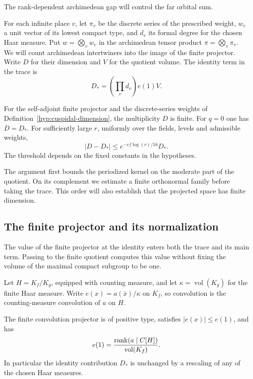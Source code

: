 The rank-dependent archimedean gap will control the far orbital sum.

For each infinite place \(v\), let \(\pi_v\) be the
discrete series of the prescribed weight, \(w_v\) a unit vector
of its lowest compact type, and \(d_v\) its formal degree for
the chosen Haar measure. Put \(w=\bigotimes_v w_v\) in the
archimedean tensor product \(\pi=\bigotimes_v\pi_v\). We will
count archimedean intertwiners into the image of the finite
projector. Write \(D\) for their dimension and \(V\) for the
quotient volume. The identity term in the trace is
\[
        D_*=\left(\prod_v d_v\right)e(1)V.
\]

\begin{proposition}\label{prop:projector-dimension}
For the self-adjoint finite projector and the discrete-series weights
of Definition~\ref{hyp:cuspidal-dimension}, the multiplicity \(D\) is finite. For \(q=0\) one has \(D=D_*\). For sufficiently large \(r\),
uniformly over the fields, levels and admissible weights,
\begin{equation}\label{eq:dimension-count}
    |D-D_*|\le e^{-rf\log(r)/16}D_* .
\end{equation}
The threshold depends on the fixed constants in the hypotheses.
\end{proposition}

The argument first bounds the periodized kernel on the moderate
part of the quotient. On its complement we estimate a finite
orthonormal family before taking the trace. This order will also
establish that the projected space has finite dimension.

\subsection{The finite projector and its normalization}

The value of the finite projector at the identity enters both the trace and its main term. Passing to the finite quotient computes this value without fixing the volume of the maximal compact subgroup to be one.

Let \(H=K_f/K_g\), equipped with counting measure, and let
\(\kappa=\operatorname{vol}(K_g)\) for the finite Haar measure.
Write \(e(x)=a(\bar x)/\kappa\) on \(K_f\), so convolution is the counting-measure convolution of \(a\) on \(H\).
\begin{lemma}\label{lem:finite-projector-mass}
The finite convolution projector is of positive type, satisfies
\(|e(x)|\le e(1)\), and has
\[
 e(1)=\frac{\operatorname{rank}(a\mid C[H])}{\operatorname{vol}(K_f)}.
\]
In particular the identity contribution \(D_*\) is unchanged by a
rescaling of any of the chosen Haar measures.
\end{lemma}

